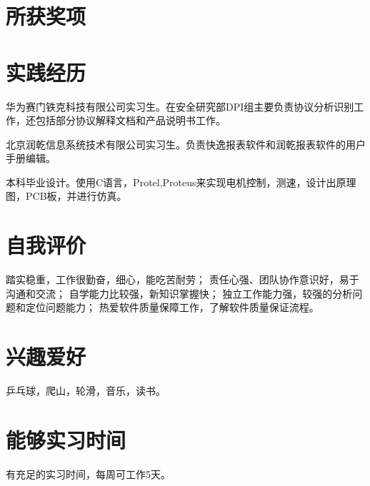 \documentclass[a4paper]{moderncv}
\begin{document}
\begin{CJK*}{UTF8}{gbsn}
\section{所获奖项}
\section{实践经历}
{华为赛门铁克科技有限公司实习生。在安全研究部DPI组主要负责协议分析识别工作，还包括部分协议解释文档和产品说明书工作。}

{ 北京润乾信息系统技术有限公司实习生。负责快逸报表软件和润乾报表软件的用户手册编辑。 }

{ 本科毕业设计。使用C语言，Protel,Proteus来实现电机控制，测速，设计出原理图，PCB板，并进行仿真。}

\section{自我评价}
\cvitem{}{}
{
踏实稳重，工作很勤奋，细心，能吃苦耐劳；
责任心强、团队协作意识好，易于沟通和交流；
自学能力比较强，新知识掌握快；
独立工作能力强，较强的分析问题和定位问题能力；
热爱软件质量保障工作，了解软件质量保证流程。
}
\section{兴趣爱好}
\cvitem{}
{
\small 乒乓球，爬山，轮滑，音乐，读书。
}
\section{能够实习时间}
\cvitem{}{}
{
有充足的实习时间，每周可工作5天。
}
\closesection
\end{CJK*}
\end{document}
